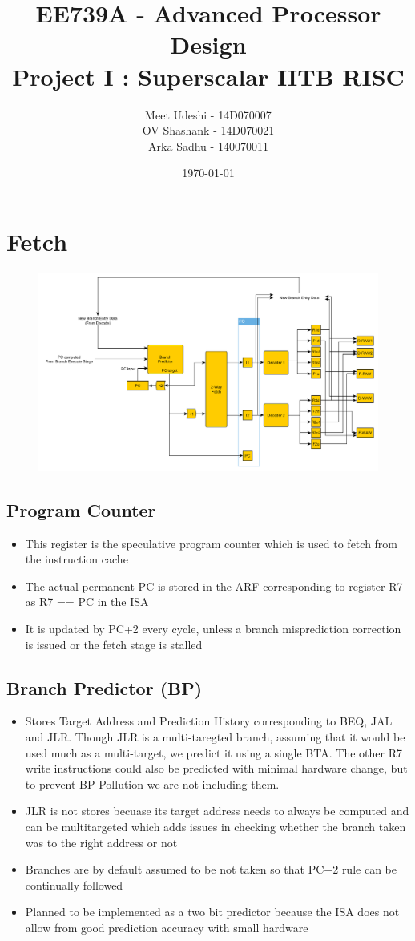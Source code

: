 \documentclass{article}
\title{EE739A - Advanced Processor Design\\
  Project I : Superscalar IITB RISC
}
\author{Meet Udeshi - 14D070007\\
  OV Shashank - 14D070021\\
  Arka Sadhu - 140070011\\
}
\date{\today}
\begin{document}
\maketitle

\section{Fetch}
\begin{figure}[H]
	\centering
	\includegraphics[scale = 0.4]{../GraphImages/fetch_decode.png}
\end{figure}

\subsection{Program Counter}
\begin{itemize}
\item This register is the speculative program counter which is used to fetch from the instruction cache
\item The actual permanent PC is stored in the ARF corresponding to register R7 as R7 == PC in the ISA
\item It is updated by PC+2 every cycle, unless a branch misprediction correction is issued or the fetch stage is stalled
\end{itemize}
\subsection{Branch Predictor (BP)}
\begin{itemize}
\item Stores Target Address and Prediction History corresponding to BEQ, JAL and JLR. Though JLR is a multi-taregted branch, assuming that it would be used much as a multi-target, we predict it using a single BTA. The other R7 write instructions could also be predicted with minimal hardware change, but to prevent BP Pollution we are not including them.
\item JLR is not stores becuase its target address needs to always be computed and can be multitargeted which adds issues in checking whether the branch taken was to the right address or not
\item Branches are by default assumed to be not taken so that PC+2 rule can be continually followed
\item Planned to be implemented as a two bit predictor because the ISA does not allow from good prediction accuracy with small hardware
\end{itemize}
\end{document}
